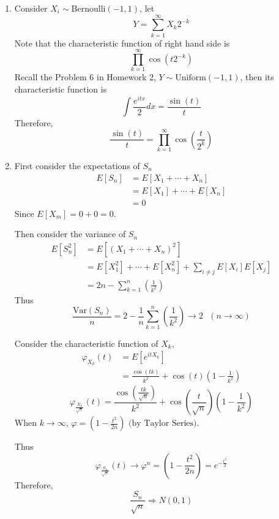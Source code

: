 \documentclass{article}
\begin{document}
\begin{enumerate}
		\item Consider $X_i \sim \text{Bernoulli}(-1,1)$, let $$Y = \sum_{k=1}^{\infty}X_k 2^{-k}$$
		Note that the characteristic function of right hand side is $$\prod_{k=1}^{\infty} \cos{(t 2^{-k})}$$
		Recall the Problem 6 in Homework 2, $Y \sim \text{Uniform}(-1,1)$, then its characteristic function is $$\int \frac{e^{itx}}{2}dx = \frac{\sin{(t)}}{t}$$
		Therefore, $$\frac{\sin{(t)}}{t} = \prod_{k=1}^{\infty} \cos{\left(\frac{t}{2^k}\right)}$$
		\item First consider the expectations of $S_n$
		\begin{align*}
			E[S_n]
			& = E[X_1 + \cdots + X_n]\\
			& = E[X_1] + \cdots + E[X_n]\\
			& = 0
		\end{align*}
		Since $E[X_m] = 0+0 = 0$.

		Then consider the variance of $S_n$
		\begin{align*}
			E[S_n^2]
			& = E\left[(X_1 + \cdots + X_n)^2\right]\\
			& = E\left[X_1^2\right] + \cdots + E\left[X_n^2\right] + \sum_{i\not=j} E[X_i]E[X_j]\\
			& = 2n - \sum_{k=1}^n\left(\frac{1}{k^2}\right)
		\end{align*}
		Thus $$\frac{\text{Var}(S_n)}{n} = 2 - \frac{1}{n}\sum_{k=1}^n\left(\frac{1}{k^2}\right) \to 2 \text{ } (n\to \infty)$$

		Consider the characteristic function of $X_k$,
		\begin{align*}
			\varphi_{X_k}(t)
			& = E[e^{itX_k}]\\
			& = \frac{\cos(tk)}{k^2} + \cos(t)\left(1-\frac{1}{k^2}\right)
		\end{align*}
		$$\varphi_{\frac{X_k}{\sqrt{n}}}(t) = \frac{\cos(\frac{tk}{\sqrt{n}})}{k^2} + \cos(\frac{t}{\sqrt{n}})\left(1-\frac{1}{k^2}\right)$$
		When $k \to \infty$, $\varphi = \left(1-\frac{t^2}{2n}\right) \text{ (by Taylor Series)}$.

		Thus 
			$$\varphi_{\frac{S_n}{\sqrt{n}}}(t) \to \varphi^n = \left(1-\frac{t^2}{2n}\right) = e^{-\frac{t^2}{2}}$$
		Therefore, $$\frac{S_n}{\sqrt{n}}\Rightarrow N(0,1)$$
	\end{enumerate}
\end{document}
